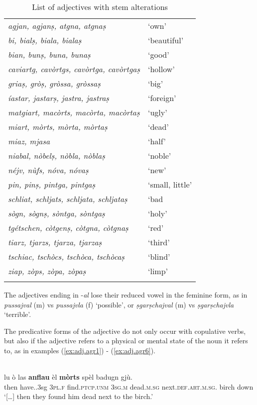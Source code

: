 \begin{table}
\caption{List of adjectives with stem alterations}
\label{tab:list:adj:stemalterations}
 \begin{tabular}{ll}
  \lsptoprule
 \textit{agjan, agjanṣ, atgna, atgnaṣ} &`own'\\
\textit{bi, bialṣ, biala, bialaṣ} &`beautiful'\\
\textit{bian, bunṣ, buna, bunaṣ} &  `good'\\
\textit{caviartg, cavòrtgs, cavòrtga, cavòrtgaṣ}& `hollow'\\
\textit{griaṣ, gròṣ, gròssa, gròssaṣ} &`big'\\
\textit{íastar, jastarṣ, jastra, jastraṣ}& `foreign'\\
\textit{matgiart, macòrts, macòrta, macòrtaṣ} &`ugly'\\
\textit{miart, mòrts, mòrta, mòrtaṣ} &`dead'\\
\textit{miaz, mjasa} & `half'\\
\textit{niabal, nòbelṣ, nòbla, nòblaṣ} & `noble'\\
\textit{néjv, nùfs, nóva, nóvaṣ} &`new'\\
\textit{pin, pinṣ, pintga, pintgaṣ} &`small, little’\\
\textit{schliat, schljats, schljata, schljataṣ}& `bad\\ 
\textit{sògn, sògnṣ, sòntga, sòntgaṣ} &`holy'\\
\textit{tgétschen, còtgenṣ, còtgna, còtgnaṣ}& `red'\\
\textit{tiarz, tjarzs, tjarza, tjarzaṣ}&`third'\\
\textit{tschiac, tschòcs, tschòca, tschòcaṣ}&`blind'\\
\textit{ziap, zòps, zòpa, zòpaṣ} & `limp'\\
  \lspbottomrule
 \end{tabular}
\end{table}

The adjectives ending in -\textit{al} lose their reduced vowel in the feminine form, as in \textit{pussajval} (m) vs \textit{pussajvla} (f) `possible', or \textit{ṣgarṣchajval} (m) vs \textit{ṣgarṣchajvla} `terrible'.


The predicative forms of the adjective do not only occur with copulative verbs, but also if the adjective refers to a physical or mental state of the noun it refers to, as in examples (\ref{ex:adj.agr1}) - (\ref{ex:adj.agr6}).

\ea
\label{ex:adj.agr1}
\\
\gll [...] lu ò las \textbf{anflau} èl \textbf{mòrts} spèl badugn gjù.\\
    {} then have.{\prs.3sg} \textsc{3pl.f} find.\textsc{ptcp.unm} \textsc{3sg.m} dead.\textsc{m.sg} next.\textsc{def.art.m.sg}. birch down\\
\glt `[…] then they found him dead next to the birch.'
\z

